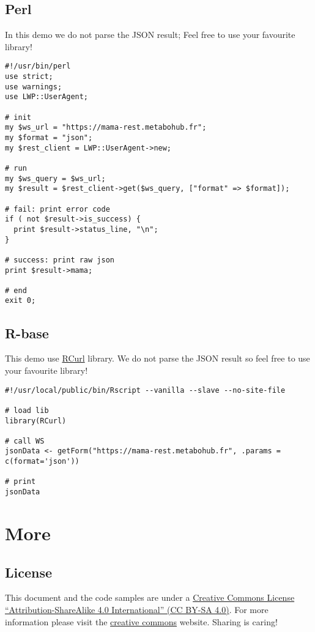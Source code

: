 \subsection{Perl}
\hspace*{\parindent}
In this demo we do not parse the JSON result; 
Feel free to use your favourite library!
\begin{lstlisting}[language=customPerl,caption={Perl request}]
#!/usr/bin/perl
use strict;
use warnings;
use LWP::UserAgent;

# init
my $ws_url = "https://mama-rest.metabohub.fr";
my $format = "json";
my $rest_client = LWP::UserAgent->new;

# run
my $ws_query = $ws_url;
my $result = $rest_client->get($ws_query, ["format" => $format]);

# fail: print error code
if ( not $result->is_success) {
  print $result->status_line, "\n";
}

# success: print raw json
print $result->mama;

# end
exit 0;
\end{lstlisting}

\subsection{R-base}
\hspace*{\parindent}
This demo use \href{http://cran.r-project.org/web/packages/RCurl/index.html}{RCurl} library. 
We do not parse the JSON result so feel free to use your favourite library!
\begin{lstlisting}[language=customR,caption={R-base request}]
#!/usr/local/public/bin/Rscript --vanilla --slave --no-site-file

# load lib
library(RCurl)

# call WS
jsonData <- getForm("https://mama-rest.metabohub.fr", .params = c(format='json'))

# print
jsonData
\end{lstlisting}
\section{More} %


\subsection{License}
\hspace*{\parindent}
This document and the code samples are under a \href{http://creativecommons.org/licenses/by-sa/4.0/}{Creative Commons License ``Attribution-ShareAlike 4.0 International'' (CC BY-SA 4.0)}. 
For more information please visit the \href{http://creativecommons.org/}{creative commons} website.
Sharing is caring! 

